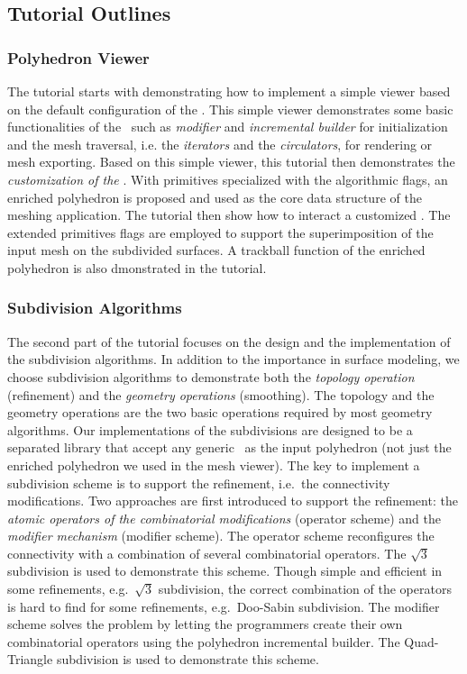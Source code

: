 \documentclass[letter]{article}
\begin{document}
\subsection*{Tutorial Outlines}
\subsubsection*{Polyhedron Viewer}
The tutorial starts with demonstrating
how to implement a simple viewer based on the default
configuration of the \cgalpoly . This simple viewer 
demonstrates some basic functionalities of the \cgalpoly\ such as
\emph{modifier} and \emph{incremental builder} for initialization and 
the mesh traversal, i.e. the \emph{iterators} and the \emph{circulators},
for rendering or mesh exporting. Based on this simple
viewer, this tutorial then demonstrates
the \emph{customization of the \poly}. With primitives 
specialized with the algorithmic flags, an enriched polyhedron
is proposed and used as the core data structure of 
the meshing application. The tutorial then show how
to interact a customized \poly . The extended primitives
flags are employed to support the superimposition of the 
input mesh on the subdivided surfaces. A trackball function
of the enriched polyhedron is also dmonstrated in the tutorial.

\subsubsection*{Subdivision Algorithms}
The second part of the tutorial focuses on the design and 
the implementation of the subdivision algorithms.
In addition to the importance in surface modeling,
we choose subdivision algorithms to demonstrate
both the \emph{topology operation} (refinement) and the 
\emph{geometry operations} (smoothing). The topology and the geometry
operations are the two basic operations required by
most geometry algorithms. Our implementations of the subdivisions 
are designed to be a separated library that accept 
any generic \poly\ as the input polyhedron (not just the enriched polyhedron
we used in the mesh viewer). The key to implement
a subdivision scheme is to support the refinement, 
i.e.\ the connectivity modifications.
Two approaches are first introduced to support the refinement:
the \emph{atomic operators of the combinatorial modifications}
(operator scheme) and the \emph{modifier mechanism} (modifier scheme).
The operator scheme reconfigures
the connectivity with a combination of several combinatorial 
operators. The $\sqrt{3}$ subdivision is used to demonstrate this scheme.
Though simple and efficient in some refinements, e.g.\ $\sqrt{3}$ 
subdivision, the correct combination of the operators is 
hard to find for some refinements, 
e.g.\ Doo-Sabin subdivision. The modifier scheme
solves the problem by letting the programmers 
create their own combinatorial operators
using the polyhedron incremental builder.
The Quad-Triangle subdivision is used to demonstrate this scheme.
\end{document}
